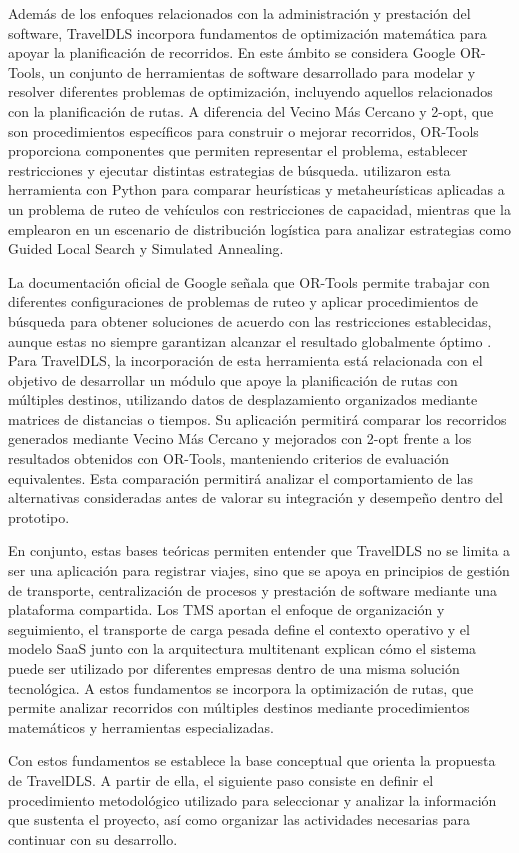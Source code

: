 Además de los enfoques relacionados con la administración y prestación del software, TravelDLS incorpora fundamentos de optimización matemática para apoyar la planificación de recorridos. En este ámbito se considera \hypertarget{concepto-ortools}{}Google OR-Tools, un conjunto de herramientas de software desarrollado para modelar y resolver diferentes problemas de optimización, incluyendo aquellos relacionados con la planificación de rutas. A diferencia del Vecino Más Cercano y 2-opt, que son procedimientos específicos para construir o mejorar recorridos, OR-Tools proporciona componentes que permiten representar el problema, establecer restricciones y ejecutar distintas estrategias de búsqueda. \textcite{muriyatmoko2024ortools} utilizaron esta herramienta con Python para comparar heurísticas y metaheurísticas aplicadas a un problema de ruteo de vehículos con restricciones de capacidad, mientras que \textcite{salsabila2023ortools} la emplearon en un escenario de distribución logística para analizar estrategias como Guided Local Search y Simulated Annealing.

La documentación oficial de Google señala que OR-Tools permite trabajar con diferentes configuraciones de problemas de ruteo y aplicar procedimientos de búsqueda para obtener soluciones de acuerdo con las restricciones establecidas, aunque estas no siempre garantizan alcanzar el resultado globalmente óptimo \parencite{googleortoolsRouting}. Para TravelDLS, la incorporación de esta herramienta está relacionada con el objetivo de desarrollar un módulo que apoye la planificación de rutas con múltiples destinos, utilizando datos de desplazamiento organizados mediante matrices de distancias o tiempos. Su aplicación permitirá comparar los recorridos generados mediante Vecino Más Cercano y mejorados con 2-opt frente a los resultados obtenidos con OR-Tools, manteniendo criterios de evaluación equivalentes. Esta comparación permitirá analizar el comportamiento de las alternativas consideradas antes de valorar su integración y desempeño dentro del prototipo.

En conjunto, estas bases teóricas permiten entender que TravelDLS no se limita a ser una aplicación para registrar viajes, sino que se apoya en principios de gestión de transporte, centralización de procesos y prestación de software mediante una plataforma compartida. Los TMS aportan el enfoque de organización y seguimiento, el transporte de carga pesada define el contexto operativo y el modelo SaaS junto con la arquitectura multitenant explican cómo el sistema puede ser utilizado por diferentes empresas dentro de una misma solución tecnológica. A estos fundamentos se incorpora la optimización de rutas, que permite analizar recorridos con múltiples destinos mediante procedimientos matemáticos y herramientas especializadas.

Con estos fundamentos se establece la base conceptual que orienta la propuesta de TravelDLS. A partir de ella, el siguiente paso consiste en definir el procedimiento metodológico utilizado para seleccionar y analizar la información que sustenta el proyecto, así como organizar las actividades necesarias para continuar con su desarrollo.

